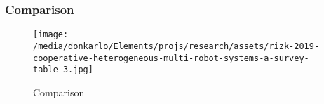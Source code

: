 \documentclass{beamer}
\begin{document}
	\begin{frame}
		\frametitle{Comparison}
		\begin{figure}[h!]
			\centering
			\texttt{[image: /media/donkarlo/Elements/projs/research/assets/rizk-2019-cooperative-heterogeneous-multi-robot-systems-a-survey-table-3.jpg]}
			\caption{Comparison}
			\label{fig:decision-making-pros-and-cons}
		\end{figure}
	\end{frame}
\end{document}
